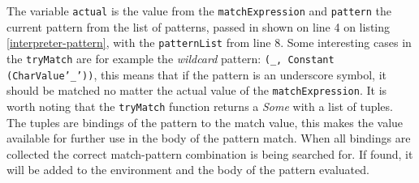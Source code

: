 The variable \texttt{actual} is the value from the \texttt{matchExpression} and \texttt{pattern} the current pattern from the list of patterns, passed in shown on line 4 on listing \ref{interpreter-pattern}, with the \texttt{patternList} from line 8.
Some interesting cases in the \texttt{tryMatch} are for example the \textit{wildcard} pattern: \texttt{(\_, Constant (CharValue'\_'))}, this means that if the pattern is an underscore symbol, it should be matched no matter the actual value of the \texttt{matchExpression}.
It is worth noting that the \texttt{tryMatch} function returns a \textit{Some} with a list of tuples. The tuples are bindings of the pattern to the match value, this makes the value available for further use in the body of the pattern match. When all bindings are collected the correct match-pattern combination is being searched for. If found, it will be added to the environment and the body of the pattern evaluated.
